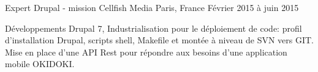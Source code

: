 \cventry
{Expert Drupal - mission} %
{Cellfish Media} %
{Paris, France} %
{Février 2015 à juin 2015} %
{
\begin{cvitems} %
    \item
    {
    Développements Drupal 7, Industrialisation pour le déploiement de code: profil d'installation Drupal,
    scripts shell, Makefile et montée à niveau de SVN vers GIT. Mise en place d'une API Rest pour répondre
    aux besoins d'une application mobile OKIDOKI.
    }
\end{cvitems}
}
